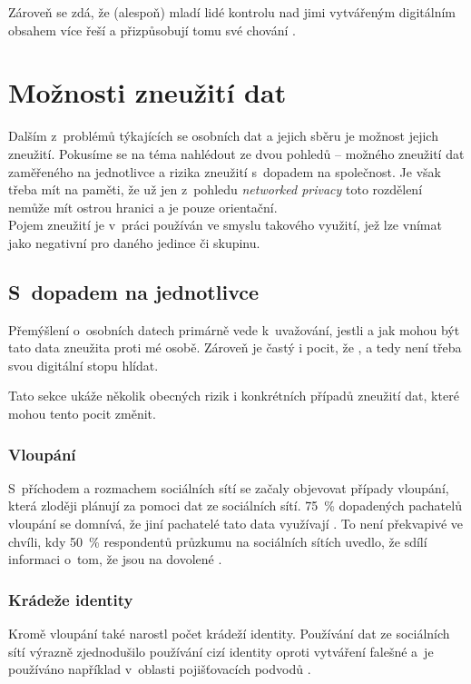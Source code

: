 Zároveň se zdá, že (alespoň) mladí lidé kontrolu nad jimi vytvářeným digitálním obsahem více řeší a přizpůsobují tomu své chování \citep{youth-online-behavior}.

\section{Možnosti zneužití dat}
Dalším z~problémů týkajících se osobních dat a jejich sběru je možnost jejich zneužití. Pokusíme se na téma nahlédout ze dvou pohledů -- možného zneužití dat zaměřeného na jednotlivce a rizika zneužití s~dopadem na společnost. Je však třeba mít na paměti, že už jen z~pohledu \textit{networked privacy} toto rozdělení nemůže mít ostrou hranici a je pouze orientační.\\
Pojem zneužití je v~práci používán ve smyslu takového využití, jež lze vnímat jako negativní pro daného jedince či skupinu.

\subsection{S~dopadem na jednotlivce}
Přemýšlení o~osobních datech primárně vede k~uvažování, jestli a jak mohou být tato data zneužita proti mé osobě. Zároveň je častý i pocit, že , a tedy není třeba svou digitální stopu hlídat.

Tato sekce ukáže několik obecných rizik i konkrétních případů zneužití dat, které mohou tento pocit změnit.

\subsubsection*{Vloupání}
S~příchodem a rozmachem sociálních sítí se začaly objevovat případy vloupání, která zloději plánují za pomoci dat ze sociálních sítí. 75~\% dopadených pachatelů vloupání se domnívá, že jiní pachatelé tato data využívají \citep{burglary}.
To není překvapivé ve chvíli, kdy 50~\% respondentů průzkumu na sociálních sítích uvedlo, že sdílí informaci o~tom, že jsou na dovolené \citep{burglary}. 

\subsubsection*{Krádeže identity}
Kromě vloupání také narostl počet krádeží identity.
Používání dat ze sociálních sítí výrazně zjednodušilo používání cizí identity oproti vytváření falešné a~je používáno například v~oblasti pojišťovacích podvodů \citep{identity-theft-rise}. 

